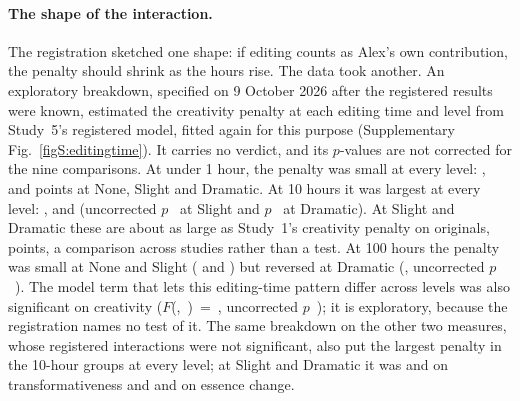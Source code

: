\paragraph*{The shape of the interaction.}
The registration sketched one shape: if editing counts as Alex's own contribution, the penalty should shrink as the hours rise. The data took another. An exploratory breakdown, specified on 9 October 2026 after the registered results were known, estimated the creativity penalty at each editing time and level from Study~5's registered model, fitted again for this purpose (Supplementary Fig.~\ref{figS:editingtime}). It carries no verdict, and its $p$-values are not corrected for the nine comparisons. At under 1 hour, the penalty was small at every level: \XSTimeCheckSFiveCreatPenaltyUnderOneHourNoneEst, \XSTimeCheckSFiveCreatPenaltyUnderOneHourSlightEst{} and \XSTimeCheckSFiveCreatPenaltyUnderOneHourDramaticEst{} points at None, Slight and Dramatic. At 10 hours it was largest at every level: \XSTimeCheckSFiveCreatPenaltyTenHoursNoneEst, \XSTimeCheckSFiveCreatPenaltyTenHoursSlightEst{} and \XSTimeCheckSFiveCreatPenaltyTenHoursDramaticEst{} (uncorrected $p$~\XSTimeCheckSFiveCreatPenaltyTenHoursSlightP{} at Slight and $p$~\XSTimeCheckSFiveCreatPenaltyTenHoursDramaticP{} at Dramatic). At Slight and Dramatic these are about as large as Study~1's creativity penalty on originals, \SOneHOneCreatDiff{} points, a comparison across studies rather than a test. At 100 hours the penalty was small at None and Slight (\XSTimeCheckSFiveCreatPenaltyHundredHoursNoneEst{} and \XSTimeCheckSFiveCreatPenaltyHundredHoursSlightEst) but reversed at Dramatic (\XSTimeCheckSFiveCreatPenaltyHundredHoursDramaticEst, uncorrected $p$~\XSTimeCheckSFiveCreatPenaltyHundredHoursDramaticP). The model term that lets this editing-time pattern differ across levels was also significant on creativity ($F$(\SFiveCreatSourceByEditTimeByModDfNum,~\SFiveCreatSourceByEditTimeByModDfDen)~=~\SFiveCreatSourceByEditTimeByModF, uncorrected $p$~\SFiveCreatSourceByEditTimeByModP); it is exploratory, because the registration names no test of it. The same breakdown on the other two measures, whose registered interactions were not significant, also put the largest penalty in the 10-hour groups at every level; at Slight and Dramatic it was \XSTimeCheckSFiveTransPenaltyTenHoursSlightEst{} and \XSTimeCheckSFiveTransPenaltyTenHoursDramaticEst{} on transformativeness and \XSTimeCheckSFiveEssPenaltyTenHoursSlightEst{} and \XSTimeCheckSFiveEssPenaltyTenHoursDramaticEst{} on essence change.

